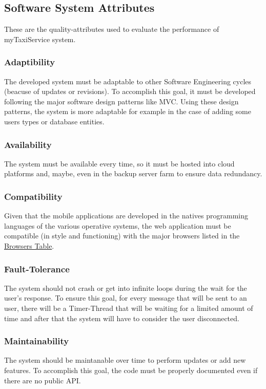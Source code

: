 \subsection{Software System Attributes}
These are the quality-attributes used to evaluate the performance of myTaxiService system.

	\subsubsection{Adaptibility}
	The developed system must be adaptable to other Software Engineering cycles (beacuse of updates or revisions). To accomplish this goal, it must be developed following the major software design patterns like MVC. Using these design patterns, the system is more adaptable for example in the case of adding some users types or database entities.

	\subsubsection{Availability}
	The system must be available every time, so it must be hosted into cloud platforms and, maybe, even in the backup server farm to ensure data redundancy.

	\subsubsection{Compatibility}
	Given that the mobile applications are developed in the natives programming languages of the various operative systems, the web application must be compatible (in style and functioning) with the major browsers listed in the \hyperref[tab:browsersTable]{Browsers Table}.

	\subsubsection{Fault-Tolerance}
	The system should not crash or get into infinite loops during the wait for the user's response. To ensure this goal, for every message that will be sent to an user, there will be a Timer-Thread that will be waiting for a limited amount of time and after that the system will have to consider the user disconnected.

	\subsubsection{Maintainability}
	The system should be maintanable over time to perform updates or add new features. To accomplish this goal, the code must be properly documented even if there are no public API.

